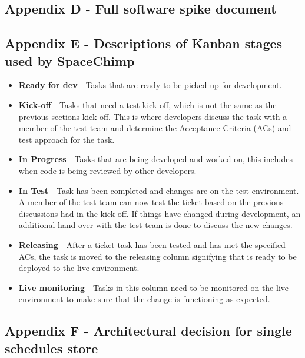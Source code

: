   
  \newpage
  \subsection{Appendix D - Full software spike document}
    \label{sec:AppendixD}
    

  \newpage
  \subsection{Appendix E - Descriptions of Kanban stages used by SpaceChimp}
    \label{sec:AppendixE}

    \begin{itemize}
      \item \textbf{Ready for dev} - Tasks that are ready to be picked up for development.
      \item \textbf{Kick-off} - Tasks that need a test kick-off, which is not the same as the previous sections kick-off. This is where developers
      discuss the task with a member of the test team and determine the Acceptance Criteria (ACs) and test approach for the task.
      \item \textbf{In Progress} - Tasks that are being developed and worked on, this includes when code is being reviewed by other developers.
      \item \textbf{In Test} - Task has been completed and changes are on the test environment. A member of the test team can now test the ticket
      based on the previous discussions had in the kick-off. If things have changed during development, an additional hand-over with the test team 
      is done to discuss the new changes.
      \item \textbf{Releasing} - After a ticket task has been tested and has met the specified ACs, the task is moved to the releasing column signifying 
      that is ready to be deployed to the live environment.
      \item \textbf{Live monitoring} - Tasks in this column need to be monitored on the live environment to make sure that the change is functioning as expected.
    \end{itemize}
    

  \newpage
  \subsection{Appendix F - Architectural decision for single schedules store}
  \label{sec:AppendixF}

